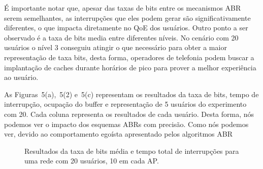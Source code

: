 É importante notar que, apesar das taxas de bits entre os mecanismos ABR serem semelhantes, as interrupções que eles podem gerar são significativamente diferentes, o que impacta diretamente no QoE dos usuários. Outro ponto a ser observado é a taxa de bits media entre diferentes níveis. No cenário com 20 usuários o nível 3 conseguiu atingir o que necessário para obter a maior representação de taxa bits, desta forma, operadores de telefonia podem buscar a implantação de caches durante horários de pico para prover a melhor experiência ao usuário.




As Figuras~5(a),~5(2) e~5(c) representam os resultados da taxa de bits, tempo de interrupção, ocupação do buffer e representação de 5 usuários do experimento com 20. Cada coluna representa os resultados de cada usuário. Desta forma, nós podemos ver o impacto dos esquemas ABRs com precisão. Como nós podemos ver, devido ao comportamento egoísta apresentado pelos algoritmos ABR 

\vspace{0.8cm}
\begin{figure}[htb]
    \captionsetup{justification=centering}
    \centering
    
    \hfil \hspace{1cm}
  \caption{Resultados da taxa de bits média e tempo total de interrupções para uma rede com 20 usuários, 10 em cada AP.}
  \label{fig:dmm}
\end{figure}

